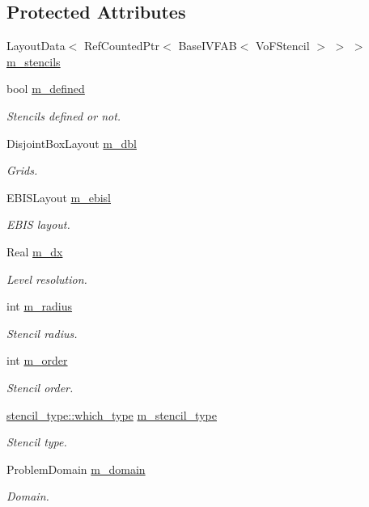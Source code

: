 \subsection*{Protected Attributes}
\begin{DoxyCompactItemize}
\item 
Layout\+Data$<$ Ref\+Counted\+Ptr$<$ Base\+I\+V\+F\+AB$<$ Vo\+F\+Stencil $>$ $>$ $>$ \hyperlink{classirreg__stencil_af70021e93b3b562d078fa5f554758799}{m\+\_\+stencils}
\item 
bool \hyperlink{classirreg__stencil_a36f61642f0fb4f1d4e645a7c45965dc8}{m\+\_\+defined}
\begin{DoxyCompactList}\small\item\em Stencils defined or not. \end{DoxyCompactList}\item 
Disjoint\+Box\+Layout \hyperlink{classirreg__stencil_a7e68afdf2c002845115ebc54084112ba}{m\+\_\+dbl}
\begin{DoxyCompactList}\small\item\em Grids. \end{DoxyCompactList}\item 
E\+B\+I\+S\+Layout \hyperlink{classirreg__stencil_a644aa60f2b1b8d6a3c29011507b3ef9c}{m\+\_\+ebisl}
\begin{DoxyCompactList}\small\item\em E\+B\+IS layout. \end{DoxyCompactList}\item 
Real \hyperlink{classirreg__stencil_a293968e88c731142a799cd09751ded7c}{m\+\_\+dx}
\begin{DoxyCompactList}\small\item\em Level resolution. \end{DoxyCompactList}\item 
int \hyperlink{classirreg__stencil_a59816b002cf4a6d0b7b60d60c9b9da31}{m\+\_\+radius}
\begin{DoxyCompactList}\small\item\em Stencil radius. \end{DoxyCompactList}\item 
int \hyperlink{classirreg__stencil_adefb470504307aaee747dc827db5a678}{m\+\_\+order}
\begin{DoxyCompactList}\small\item\em Stencil order. \end{DoxyCompactList}\item 
\hyperlink{namespacestencil__type_a1ffed19935b7289b50e8dcc017ee99c8}{stencil\+\_\+type\+::which\+\_\+type} \hyperlink{classirreg__stencil_a948de19056327d2d6334a5e04059c5d0}{m\+\_\+stencil\+\_\+type}
\begin{DoxyCompactList}\small\item\em Stencil type. \end{DoxyCompactList}\item 
Problem\+Domain \hyperlink{classirreg__stencil_a55c882eb6a84dadfa76c97e3482c2cb4}{m\+\_\+domain}
\begin{DoxyCompactList}\small\item\em Domain. \end{DoxyCompactList}\end{DoxyCompactItemize}


